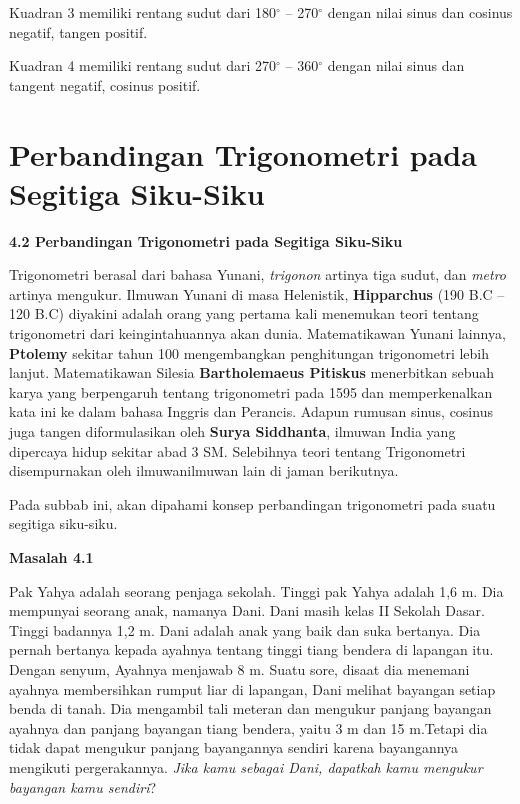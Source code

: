 \documentclass[11pt,fleqn]{book} %
\begin{document}
\noindent Kuadran 3 memiliki rentang sudut dari 180${}^\circ$ -- 270${}^\circ$ dengan nilai sinus dan cosinus negatif, tangen positif.

\noindent Kuadran 4 memiliki rentang sudut dari 270${}^\circ$ -- 360${}^\circ$ dengan nilai sinus dan tangent negatif, cosinus positif.

\noindent 

\noindent 


\section{Perbandingan Trigonometri pada Segitiga Siku-Siku}

\noindent \textbf{4.2 Perbandingan Trigonometri pada Segitiga Siku-Siku}

\textbf{ }

\textbf{ }Trigonometri berasal dari bahasa Yunani, \textit{trigonon }artinya tiga sudut, dan \textit{metro }artinya mengukur. Ilmuwan Yunani di masa Helenistik, \textbf{Hipparchus }(190 B.C -- 120 B.C) diyakini adalah orang yang pertama kali menemukan teori tentang trigonometri dari keingintahuannya akan dunia. Matematikawan Yunani lainnya, \textbf{Ptolemy }sekitar tahun 100 mengembangkan penghitungan trigonometri lebih lanjut. Matematikawan Silesia \textbf{Bartholemaeus Pitiskus} menerbitkan sebuah karya yang berpengaruh tentang trigonometri pada 1595 dan memperkenalkan kata ini ke dalam bahasa Inggris dan Perancis. Adapun rumusan sinus, cosinus juga tangen diformulasikan oleh \textbf{Surya Siddhanta}, ilmuwan India yang dipercaya hidup sekitar abad 3 SM. Selebihnya teori tentang Trigonometri disempurnakan oleh ilmuwanilmuwan lain di jaman berikutnya.

\noindent 

\noindent Pada subbab ini, akan dipahami konsep perbandingan trigonometri pada suatu segitiga siku-siku.

\noindent 

\noindent \textbf{Masalah 4.1}

\noindent \textbf{}

\noindent Pak Yahya adalah seorang penjaga sekolah. Tinggi pak Yahya adalah 1,6 m. Dia mempunyai seorang anak, namanya Dani. Dani masih kelas II Sekolah Dasar. Tinggi badannya 1,2 m. Dani adalah anak yang baik dan suka bertanya. Dia pernah bertanya kepada ayahnya tentang tinggi tiang bendera di lapangan itu. Dengan senyum, Ayahnya menjawab 8 m. Suatu sore, disaat dia menemani ayahnya membersihkan rumput liar di lapangan, Dani melihat bayangan setiap benda di tanah. Dia mengambil tali meteran dan mengukur panjang bayangan ayahnya dan panjang bayangan tiang bendera, yaitu 3 m dan 15 m.Tetapi dia tidak dapat mengukur panjang bayangannya sendiri karena bayangannya mengikuti pergerakannya. \textit{Jika kamu sebagai Dani, dapatkah} \textit{kamu mengukur bayangan kamu sendiri}?
\end{document}
